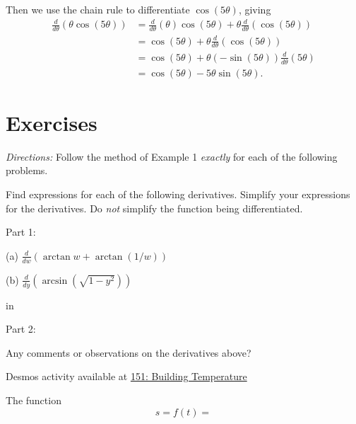 \documentclass{ximera}
\newcommand{\pskip}{\vskip 0.1 in}
\begin{document}
\begin{example}
\begin{explanation}
Then we use the chain rule to differentiate $\cos(5\theta)$, giving
\begin{align*}
       \frac{d}{d\theta} \left( \theta \cos (5\theta) \right) &= \frac{d}{d\theta} \left(  \theta \right) \cos (5\theta) + \theta \frac{d}{d\theta} \left(  \cos (5\theta) \right)  \\ 
                          &= \cos(5\theta) + \theta  \frac{d}{d\theta} \left(  \cos (5\theta) \right)  \\
                         &= \cos(5\theta) + \theta (-\sin (5\theta)) \frac{d}{d\theta} \left( 5\theta  \right)  \\
                         &= \cos (5\theta) - 5 \theta \sin (5\theta) .
\end{align*}


\end{explanation}


\end{example}



\section*{Exercises}

\emph{Directions:} Follow the method of Example 1 \emph{exactly} for each of the following problems.


\begin{question}  \label{Q:MMMDNFD}
Find expressions for each of the following derivatives. Simplify your expressions for the derivatives. Do \emph{not} simplify the function being differentiated.

Part 1:

(a)  $\frac{d}{dw} \left( \arctan w + \arctan (1/w) \right)$ 

(b) $\frac{d}{dy} \left(  \arcsin\left(  \sqrt{1-y^2} \right) \right)$

\pskip

Part 2:

Any comments or observations on the derivatives above?


\end{question}


\begin{question}  \label{Q:Dfrg4ttgg}

\begin{onlineOnly}
    \begin{center}
\end{center}
\end{onlineOnly}

Desmos activity available at \href{https://www.desmos.com/calculator/zjqsdhvz4p}{151: Building Temperature}

\end{question}

\begin{question}  \label{Q:MXCXV}
The function
\[
   s = f(t) = 
\]
\end{question} 
\end{document}
